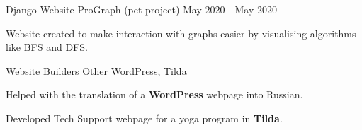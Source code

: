 \begin{cventries}
  \cventry
    {Django Website}
    {ProGraph (pet project)} 
    {} %
    {May 2020 -  May 2020} %
    {
      \begin{cvitems} %
        \item {Website created to make interaction with graphs easier by 
            visualising algorithms like BFS and DFS.}
      \end{cvitems}
    }

  \cventry
    {Website Builders}
    {Other} 
    {WordPress, Tilda} %
    {} %
    {
      \begin{cvitems} %
        \item {Helped with the translation of a 
            \textbf{WordPress} webpage into Russian. 
            }
        \item {Developed Tech Support webpage for a yoga program
            in \textbf{Tilda}.}
      \end{cvitems}
    }
 

\end{cventries}
